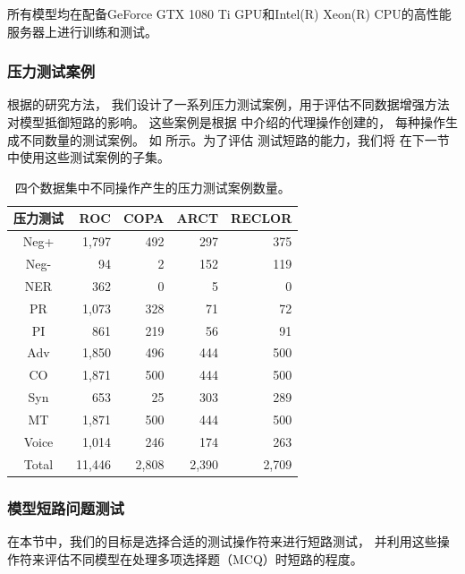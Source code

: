 所有模型均在配备GeForce GTX 1080 Ti GPU和Intel(R) Xeon(R) CPU的高性能服务器上进行训练和测试。


\subsubsection*{压力测试案例}
根据\cite{checklist2020acl}的研究方法，
我们设计了一系列压力测试案例，用于评估不同数据增强方法对模型抵御短路的影响。
这些案例是根据 中介绍的代理操作创建的，
每种操作生成不同数量的测试案例。
如  所示。为了评估
测试短路的能力，我们将
在下一节中使用这些测试案例的子集。

\begin{table}[th]
    \centering
    \scriptsize
    \begin{tabular}{c|rrrr}
    \toprule
    \textbf{压力测试} & \textbf{ROC} & \textbf{COPA} & \textbf{ARCT} & \textbf{RECLOR} \\ \midrule
    Neg+  &	1,797&492&	297&375	\\ \hline
    Neg-  &	94&	2&	152&	119\\ \hline
    NER  &	362&	0&	5&0	\\ \hline
    PR  &	1,073&	328&71&72	\\ \hline
    PI  &	     861&	219&	56&	91\\ \midrule
    Adv  &	1,850&496	&444	&500	\\ \hline
    CO  &	1,871&500	&444	&500	\\ \hline
    Syn&	653&	 25&	303&289	\\ \midrule
    MT  &	1,871&500	&444	&500	\\ \hline
    Voice  &	1,014&246	&174	&263	\\ \hline
    Total & 11,446  &  2,808 & 2,390 & 2,709 \\ \bottomrule
    \end{tabular}
    \caption{四个数据集中不同操作产生的压力测试案例数量。}
    \label{tab3:cases}
    \end{table}

\subsubsection{模型短路问题测试}
\label{sec3:short_circuit}

在本节中，我们的目标是选择合适的测试操作符来进行短路测试，
并利用这些操作符来评估不同模型在处理多项选择题（MCQ）时短路的程度。

